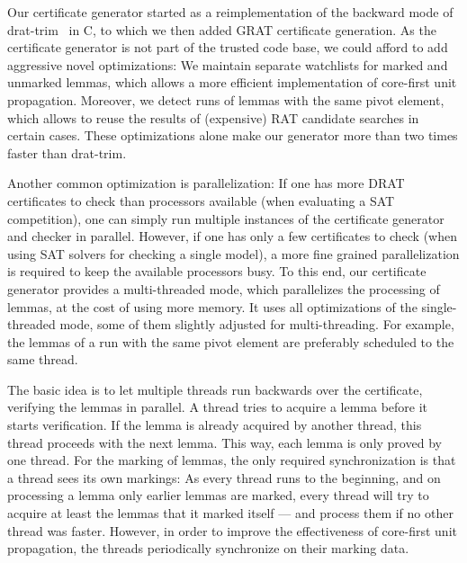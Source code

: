 \documentclass[smallcondensed]{svjour3}     %
\newcommand\CC{C\nolinebreak[4]\hspace{-.05em}\raisebox{.4ex}{\relsize{-3}{\textbf{++}}}}
\begin{document}
Our certificate generator started as a reimplementation of the backward mode of drat-trim~\cite{WHH13,drat-trim-webpage} in \CC, to 
which we then added GRAT certificate generation. 
As the certificate generator is not part of the trusted code base, we could afford to add aggressive novel optimizations:
We maintain separate watchlists for marked and unmarked lemmas, which allows a more efficient implementation of core-first unit propagation.
Moreover, we detect runs of lemmas with the same pivot element, which allows to reuse the results of (expensive) RAT candidate searches in certain cases.
These optimizations alone make our generator more than two times faster than drat-trim. 

Another common optimization is parallelization: If one has more DRAT certificates to check than processors 
available (\eg when evaluating a SAT competition), one can simply run multiple instances of the certificate generator and checker in parallel.
However, if one has only a few certificates to check (\eg when using SAT solvers for checking a single model), a more fine grained parallelization 
is required to keep the available processors busy. 
To this end, our certificate generator provides a multi-threaded mode,
which parallelizes the processing of lemmas, at the cost of using more memory. 
It uses all optimizations of the single-threaded mode, some of them slightly adjusted for multi-threading. 
For example, the lemmas of a run with the same pivot element are preferably scheduled to the same thread.

The basic idea is to let multiple threads run backwards over the certificate, verifying the lemmas in parallel.
A thread tries to acquire a lemma before it starts verification. If the lemma is already acquired 
by another thread, this thread proceeds with the next lemma. This way, each lemma is only proved by one thread.
For the marking of lemmas, the only required synchronization is that a thread sees its own markings: As every thread runs to the beginning, 
and on processing a lemma only earlier lemmas are marked, every thread will try to acquire at least the lemmas that it marked itself --- and 
process them if no other thread was faster. 
However, in order to improve the effectiveness of core-first unit propagation, the threads periodically synchronize on their marking data.
\end{document}
